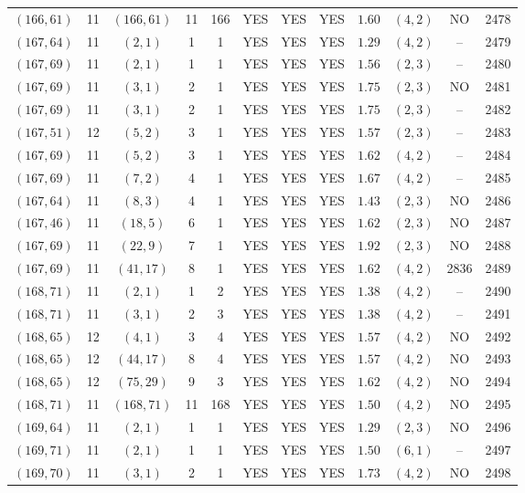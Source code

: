 \begin{longtable}{|c|c|c|c|c|c|c|c|c|c|c|c|}
$(166,61)$ & 11 & $(166,61)$ & 11 & 166 & YES & YES & YES & $1.60$ & $(4,2)$ & NO & 2478\\
$(167,64)$ & 11 & $(2,1)$ & 1 & 1 & YES & YES & YES & $1.29$ & $(4,2)$ & -- & 2479\\
$(167,69)$ & 11 & $(2,1)$ & 1 & 1 & YES & YES & YES & $1.56$ & $(2,3)$ & -- & 2480\\
$(167,69)$ & 11 & $(3,1)$ & 2 & 1 & YES & YES & YES & $1.75$ & $(2,3)$ & NO & 2481\\
$(167,69)$ & 11 & $(3,1)$ & 2 & 1 & YES & YES & YES & $1.75$ & $(2,3)$ & -- & 2482\\
$(167,51)$ & 12 & $(5,2)$ & 3 & 1 & YES & YES & YES & $1.57$ & $(2,3)$ & -- & 2483\\
$(167,69)$ & 11 & $(5,2)$ & 3 & 1 & YES & YES & YES & $1.62$ & $(4,2)$ & -- & 2484\\
$(167,69)$ & 11 & $(7,2)$ & 4 & 1 & YES & YES & YES & $1.67$ & $(4,2)$ & -- & 2485\\
$(167,64)$ & 11 & $(8,3)$ & 4 & 1 & YES & YES & YES & $1.43$ & $(2,3)$ & NO & 2486\\
$(167,46)$ & 11 & $(18,5)$ & 6 & 1 & YES & YES & YES & $1.62$ & $(2,3)$ & NO & 2487\\
$(167,69)$ & 11 & $(22,9)$ & 7 & 1 & YES & YES & YES & $1.92$ & $(2,3)$ & NO & 2488\\
$(167,69)$ & 11 & $(41,17)$ & 8 & 1 & YES & YES & YES & $1.62$ & $(4,2)$ & 2836 & 2489\\
$(168,71)$ & 11 & $(2,1)$ & 1 & 2 & YES & YES & YES & $1.38$ & $(4,2)$ & -- & 2490\\
$(168,71)$ & 11 & $(3,1)$ & 2 & 3 & YES & YES & YES & $1.38$ & $(4,2)$ & -- & 2491\\
$(168,65)$ & 12 & $(4,1)$ & 3 & 4 & YES & YES & YES & $1.57$ & $(4,2)$ & NO & 2492\\
$(168,65)$ & 12 & $(44,17)$ & 8 & 4 & YES & YES & YES & $1.57$ & $(4,2)$ & NO & 2493\\
$(168,65)$ & 12 & $(75,29)$ & 9 & 3 & YES & YES & YES & $1.62$ & $(4,2)$ & NO & 2494\\
$(168,71)$ & 11 & $(168,71)$ & 11 & 168 & YES & YES & YES & $1.50$ & $(4,2)$ & NO & 2495\\
$(169,64)$ & 11 & $(2,1)$ & 1 & 1 & YES & YES & YES & $1.29$ & $(2,3)$ & NO & 2496\\
$(169,71)$ & 11 & $(2,1)$ & 1 & 1 & YES & YES & YES & $1.50$ & $(6,1)$ & -- & 2497\\
$(169,70)$ & 11 & $(3,1)$ & 2 & 1 & YES & YES & YES & $1.73$ & $(4,2)$ & NO & 2498\\

\end{longtable}
